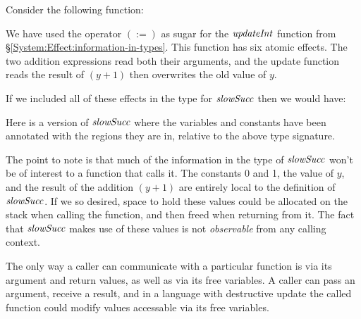 Consider the following function:


We have used the operator $(:=)$ as sugar for the $\operatorname{\mathit{updateInt}}$ function from \S\ref{System:Effect:information-in-types}. This function has six atomic effects. The two addition expressions read both their arguments, and the update function reads the result of $(y+1)$ then overwrites the old value of $y$. 

If we included all of these effects in the type for $\operatorname{\mathit{slowSucc}}$ then we would have:


Here is a version of $\operatorname{\mathit{slowSucc}}$ where the variables and constants have been annotated with the regions they are in, relative to the above type signature.


The point to note is that much of the information in the type of $\operatorname{\mathit{slowSucc}}$ won't be of interest to a function that calls it. The constants 0 and 1, the value of $y$, and the result of the addition $(y + 1)$ are entirely local to the definition of $\operatorname{\mathit{slowSucc}}$. If we so desired, space to hold these values could be allocated on the stack when calling the function, and then freed when returning from it. The fact that $\operatorname{\mathit{slowSucc}}$ makes use of these values is not \emph{observable} from any calling context. 

The only way a caller can communicate with a particular function is via its argument and return values, as well as via its free variables. A caller can pass an argument, receive a result, and in a language with destructive update the called function could modify values accessable via its free variables.


